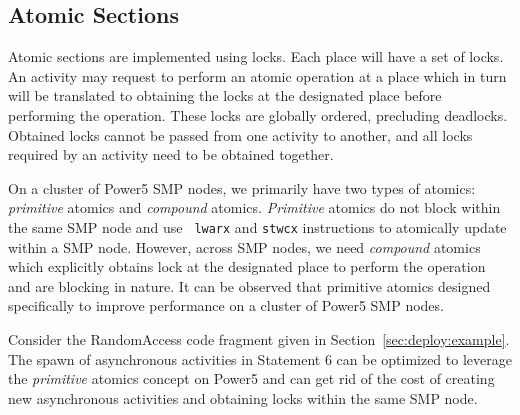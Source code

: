 \subsection{Atomic Sections}
Atomic sections are implemented using locks. Each place will have a set
of locks.  An activity may request to perform an atomic operation at a
place which in turn will be translated to obtaining the locks at the
designated place before performing the operation. These locks are
globally ordered, precluding deadlocks. Obtained locks cannot be passed
from one activity to another, and all locks required by an activity need
to be obtained together. 

On a cluster of Power5 SMP nodes, we primarily have two types of
atomics: {\it primitive} atomics and {\it compound} atomics. {\it
Primitive} atomics do not block within the same SMP node and use {\tt
lwarx} and {\tt stwcx} instructions to atomically update within a SMP
node. However, across SMP nodes, we need {\it compound} atomics which
explicitly obtains lock at the designated place to perform the operation
and are blocking in nature. It can be observed that primitive atomics
designed specifically to improve performance on a cluster of Power5 SMP
nodes.

Consider the RandomAccess code fragment given in
Section~\ref{sec:deploy:example}. The spawn of asynchronous activities
in Statement 6 can be optimized to leverage the {\it primitive} atomics
concept on Power5 and can get rid of the cost of creating new
asynchronous activities and obtaining locks within the same SMP node.
